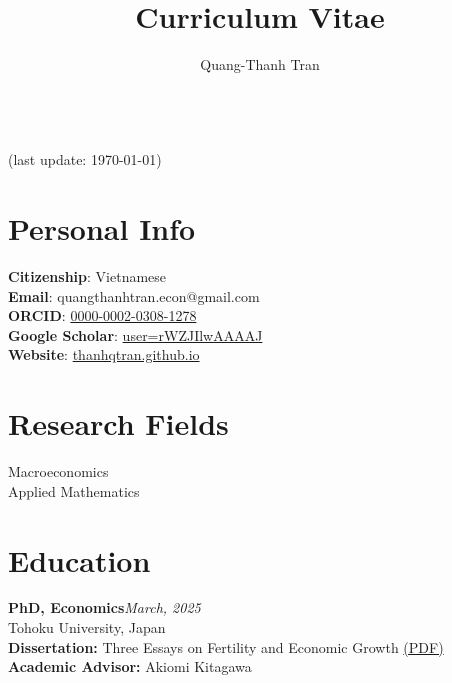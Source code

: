 \documentclass[12pt]{article}
\newcommand{\cvcolor}{\color{DodgerBlue4}} %
\renewcommand{\maketitle}{
\begin{center}
{\Huge\theauthor}\\
{\color{Gray}(last update: \today)}
\end{center}
}
\begin{document}
\title{Curriculum Vitae} %
\author{Quang-Thanh Tran}

\maketitle


\section{Personal Info}
\textbf{Citizenship}: Vietnamese \\
\textbf{Email}: quangthanhtran.econ@gmail.com \\
\textbf{ORCID}: \href{https://orcid.org/0000-0002-0308-1278}{0000-0002-0308-1278}\\
\textbf{Google Scholar}: \href{https://scholar.google.com/citations?user=rWZJIlwAAAAJ&hl=en}{user=rWZJIlwAAAAJ}\\
\textbf{Website}: \href{https://thanhqtran.github.io}{thanhqtran.github.io} \\


\section{Research Fields}
Macroeconomics \\
Applied Mathematics


\section{Education}

\textbf{PhD, Economics}\hfill\emph{March, 2025}\\
Tohoku University, Japan \\
\textbf{Dissertation:} Three Essays on Fertility and Economic Growth \href{https://tohoku.repo.nii.ac.jp/record/2003894/files/250325-TRAN-221-1.pdf}{(PDF)}\\
\textbf{Academic Advisor:} Akiomi Kitagawa
\end{document}
